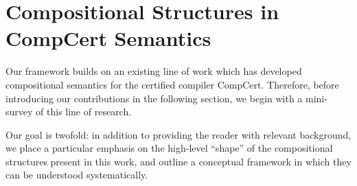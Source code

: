 \documentclass[acmsmall,screen,review,anonymous]{acmart}
\begin{document}
%
%
%
%
%
%
%
%


\section{Compositional Structures in CompCert Semantics} %


Our framework builds on an existing line of work
which has developed
compositional semantics for the certified compiler CompCert.
Therefore,
before introducing our contributions in the following section,
we begin with a mini-survey of this line of research.

Our goal is twofold:
in addition to providing the reader with relevant background,
we place a particular emphasis on the high-level ``shape''
of the compositional structures present in this work,
and outline a conceptual framework in which they can be understood
systematically.
\end{document}
